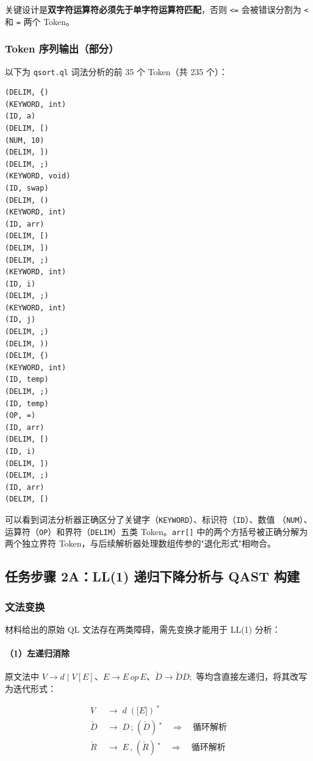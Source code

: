 \documentclass[12pt,a4paper]{ctexart}
\begin{document}
关键设计是\textbf{双字符运算符必须先于单字符运算符匹配}，否则 \texttt{<=} 会被错误分割为
\texttt{<} 和 \texttt{=} 两个 Token。

\subsubsection{Token 序列输出（部分）}

以下为 \texttt{qsort.ql} 词法分析的前 35 个 Token（共 235 个）：

\begin{lstlisting}[language={}, caption={qsort.tokens（前 35 行）}]
(DELIM, {)
(KEYWORD, int)
(ID, a)
(DELIM, [)
(NUM, 10)
(DELIM, ])
(DELIM, ;)
(KEYWORD, void)
(ID, swap)
(DELIM, ()
(KEYWORD, int)
(ID, arr)
(DELIM, [)
(DELIM, ])
(DELIM, ;)
(KEYWORD, int)
(ID, i)
(DELIM, ;)
(KEYWORD, int)
(ID, j)
(DELIM, ;)
(DELIM, ))
(DELIM, {)
(KEYWORD, int)
(ID, temp)
(DELIM, ;)
(ID, temp)
(OP, =)
(ID, arr)
(DELIM, [)
(ID, i)
(DELIM, ])
(DELIM, ;)
(ID, arr)
(DELIM, [)
\end{lstlisting}

可以看到词法分析器正确区分了关键字（\texttt{KEYWORD}）、标识符（\texttt{ID}）、数值
（\texttt{NUM}）、运算符（\texttt{OP}）和界符（\texttt{DELIM}）五类 Token。\texttt{arr[]}
中的两个方括号被正确分解为两个独立界符 Token，与后续解析器处理数组传参的"退化形式"相吻合。

\subsection{任务步骤 2A：LL(1) 递归下降分析与 QAST 构建}

\subsubsection{文法变换}

材料给出的原始 QL 文法存在两类障碍，需先变换才能用于 LL(1) 分析：

\paragraph{（1）左递归消除}

原文法中 $V \to d \mid V[E]$、$E \to E\,\mathit{op}\,E$、$\check{D} \to \check{D}D;$ 等均含直接左递归，将其改写为迭代形式：

\begin{align*}
V &\;\to\; d\;(\texttt{[}E\texttt{]})\,^* \\
\check{D} &\;\to\; D\,\texttt{;}\;(\check{D})\,^* \quad\Rightarrow\quad \text{循环解析} \\
\check{R} &\;\to\; E\,\texttt{,}\;(\check{R})\,^* \quad\Rightarrow\quad \text{循环解析}
\end{align*}
\end{document}
